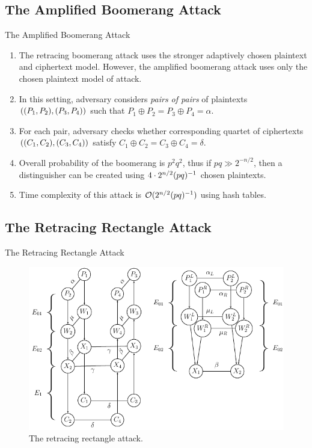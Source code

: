 \documentclass[notheorems]{beamer}
\theoremstyle{definition}
\theoremstyle{example}
\begin{document}
    \subsection{The Amplified Boomerang Attack}

    \begin{frame}[<+->]{The Amplified Boomerang Attack}
        \begin{enumerate}
            \item The retracing boomerang attack uses the stronger adaptively
            chosen plaintext and ciphertext model. However, the amplified
            boomerang attack uses only the chosen plaintext model of attack.
            \item In this setting, adversary considers \emph{pairs of pairs} of
            plaintexts \(((P_1, P_2), (P_3, P_4))\) such that
            \(P_1 \oplus P_2 = P_3 \oplus P_4 = \alpha\).
            \item For each pair, adversary checks whether corresponding quartet
            of ciphertexts \(((C_1, C_2), (C_3, C_4))\) satisfy
            \(C_1 \oplus C_2 = C_3 \oplus C_4 = \delta\).
            \item Overall probability of the boomerang is \(p^2q^2\), thus if
            \(pq \gg 2^{-n/2}\), then a distinguisher can be created using \(4
            \cdot 2^{n/2}(pq)^{-1}\) chosen plaintexts.
            \item Time complexity of this attack is
            \(\mathcal O(2^{n/2}(pq)^{-1})\) using hash tables.
        \end{enumerate}
    \end{frame}

    \subsection{The Retracing Rectangle Attack}
    \label{subsec:retracing-rectangle}

    \begin{frame}{The Retracing Rectangle Attack}
        \begin{figure}
            \centering
            \includegraphics[width=0.6\columnwidth]{images/retracing_rectangle.png}
            \caption{The retracing rectangle attack.}
            \label{fig:retr-rectangle}
        \end{figure}
    \end{frame}
    
\end{document}
